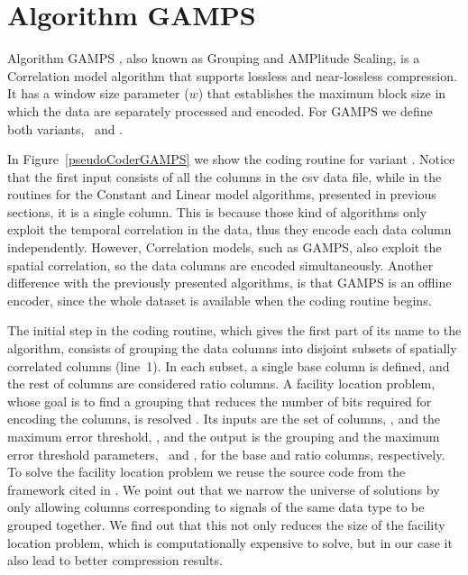 
\clearpage

\section{Algorithm GAMPS}
\label{algo:gamps}

Algorithm GAMPS \cite{coder:gamps}, also known as Grouping and AMPlitude Scaling, is a Correlation model algorithm that supports lossless and near-lossless compression. It has a window size parameter ($w$) that establishes the maximum block size in which the data are separately processed and encoded. For GAMPS we define both variants, \maskalgo\ and \NOmaskalgo.


In Figure~\ref{pseudoCoderGAMPS} we show the coding routine for variant \maskalgo. Notice that the first input consists of all the columns in the csv data file, while in the routines for the Constant and Linear model algorithms, presented in previous sections, it is a single column. This is because those kind of algorithms only exploit the temporal correlation in the data, thus they encode each data column independently. However, Correlation models, such as GAMPS, also exploit the spatial correlation, so the data columns are encoded simultaneously. Another difference with the previously presented algorithms, is that GAMPS is an offline encoder, since the whole dataset is available when the coding routine begins. 





The initial step in the coding routine, which gives the first part of its name to the algorithm, consists of grouping the data columns into disjoint subsets of spatially correlated columns (line~1). In each subset, a single base column is defined, and the rest of columns are considered ratio columns. A facility location problem, whose goal is to find a grouping that reduces the number of bits required for encoding the columns, is resolved \cite{coder:gamps}. Its inputs are the set of columns, \columns, and the maximum error threshold, \maxerror, and the output is the grouping and the maximum error threshold parameters, \epsilonB\ and \epsilonR, for the base and ratio columns, respectively. To solve the facility location problem we reuse the source code from the framework cited in \cite{AnEva2013}. We point out that we narrow the universe of solutions by only allowing columns corresponding to signals of the same data type to be grouped together. We find out that this not only reduces the size of the facility location problem, which is computationally expensive to solve, but in our case it also lead to better compression results. 


